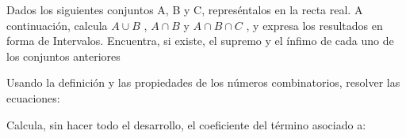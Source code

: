 \documentclass[addpoints,spanish, 12pt,a4paper]{exam}
\begin{document}
        \begin{questions}
        \question Dados los siguientes conjuntos A, B y C, represéntalos en la recta real. A continuación, calcula $A \cup  B$ , $A \cap B$ y $A \cap B \cap C$ , 
y expresa los resultados en forma de Intervalos. 
Encuentra, si existe, el supremo y el ínfimo de cada uno de los
conjuntos anteriores
        \begin{multicols}{1} 
        \begin{parts} \part[2]  $ A=\left\{ x \in \mathbb{R}| -2 \leq x \wedge x \leq 5 \right\}, \\ B=\left(-\infty, -1\right) \cup \left(1, \infty\right)  y \\  C=\left\{ x \in \mathbb{R}| \left|{x - 2}\right|\leq3 \right\} \\ $  \begin{solution}  $ A \cup  B = \left(-\infty, \infty\right)  \\  A \cap B= \left[-2, -1\right) \cup \left(1, 5\right]   \\  A \cap B  \cap C= \left(1, 5\right] $  \end{solution}
        \end{parts}
        \end{multicols}
        \question Usando la definición y las propiedades de los números combinatorios, resolver las ecuaciones:
        \begin{multicols}{1} 
        \end{multicols}
        \question Calcula, sin hacer todo el desarrollo, el coeficiente del término asociado a:
        \begin{multicols}{1} 
\end{multicols}
\end{questions}
\end{document}

